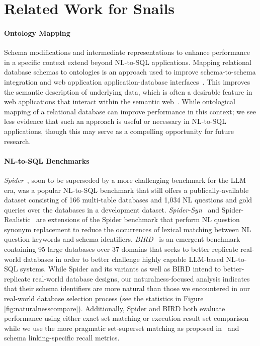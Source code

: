 \section{Related Work for Snails}



\paragraph{\textbf{Ontology Mapping}}
Schema modifications and intermediate representations to enhance performance in a specific context extend beyond NL-to-SQL applications.
Mapping relational database schemas to ontologies is an approach used to improve schema-to-schema integration and web application application-database interfaces~\cite{4061430}.
This improves the semantic description of underlying data, which is often a desirable feature in web applications that interact within the semantic web~\cite{7396620}.
While ontological mapping of a relational database can improve performance in this context; we see less evidence that such an approach is useful or necessary in NL-to-SQL applications, though this may serve as a compelling opportunity for future research.

\paragraph{\textbf{NL-to-SQL Benchmarks}}
\emph{Spider}~\cite{Yu&al.18c}, soon to be superseded by a more challenging benchmark for the LLM era, was a popular NL-to-SQL benchmark that still offers a publically-available dataset consisting of 166 multi-table databases and 1,034 NL questions and gold queries over the databases in a development dataset. 
\emph{Spider-Syn}~\cite{gan-etal-2021-towards} and Spider-Realistic~\cite{gan-etal-2021-towards} are extensions of the Spider benchmark that perform NL question synonym replacement to reduce the occurrences of lexical matching between NL question keywords and schema identifiers.
\emph{BIRD}~\cite{li2023llm} is an emergent benchmark containing 95 large databases over 37 domains that seeks to better replicate real-world databases in order to better challenge highly capable LLM-based NL-to-SQL systems.
While Spider and its variants as well as BIRD intend to better-replicate real-world database designs, our naturalness-focused analysis indicates that their schema identifiers are more natural than those we encountered in our real-world database selection process (see the statistics in Figure \ref{fig:naturalnesscompare}).
Additionally, Spider and BIRD both evaluate performance using either exact set matching or execution result set comparison while we use the more pragmatic set-superset matching as proposed in~\cite{floratou2024nl2sql} and schema linking-specific recall metrics.

